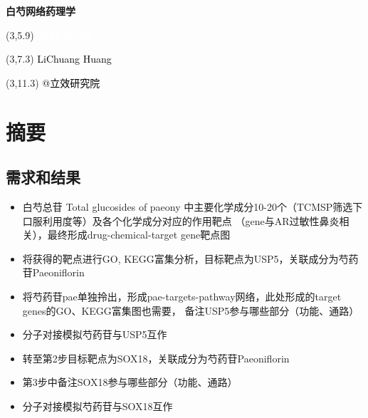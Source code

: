 \documentclass[
]{article}
\author{}
\date{\vspace{-2.5em}}
\providecommand{\tightlist}{%
  \setlength{\itemsep}{0pt}\setlength{\parskip}{0pt}}
\begin{document}
\begin{titlepage} 
\begin{center} \textbf{\Huge 白芍网络药理学}
\vspace{4em} \begin{textblock}{10}(3,5.9) \huge
\textbf{\textcolor{white}{2024-03-08}}
\end{textblock} \begin{textblock}{10}(3,7.3)
\Large \textcolor{black}{LiChuang Huang}
\end{textblock} \begin{textblock}{10}(3,11.3)
\Large \textcolor{black}{@立效研究院}
\end{textblock} \end{center} \end{titlepage}
\restoregeometry


\tableofcontents

\listoffigures

\listoftables

\newpage


\hypertarget{abstract}{%
\section{摘要}\label{abstract}}

\hypertarget{ux9700ux6c42ux548cux7ed3ux679c}{%
\subsection{需求和结果}\label{ux9700ux6c42ux548cux7ed3ux679c}}

\begin{itemize}
\tightlist
\item
  白芍总苷 Total glucosides of paeony 中主要化学成分10-20个（TCMSP筛选下口服利用度等）及各个化学成分对应的作用靶点
  （gene与AR过敏性鼻炎相关），最终形成drug-chemical-target gene靶点图
\item
  将获得的靶点进行GO, KEGG富集分析，目标靶点为USP5，关联成分为芍药苷Paeoniflorin
\item
  将芍药苷pae单独拎出，形成pae-targets-pathway网络，此处形成的target genes的GO、KEGG富集图也需要，
  备注USP5参与哪些部分（功能、通路）
\item
  分子对接模拟芍药苷与USP5互作
\item
  转至第2步目标靶点为SOX18，关联成分为芍药苷Paeoniflorin
\item
  第3步中备注SOX18参与哪些部分（功能、通路）
\item
  分子对接模拟芍药苷与SOX18互作
\end{itemize}
\end{document}
